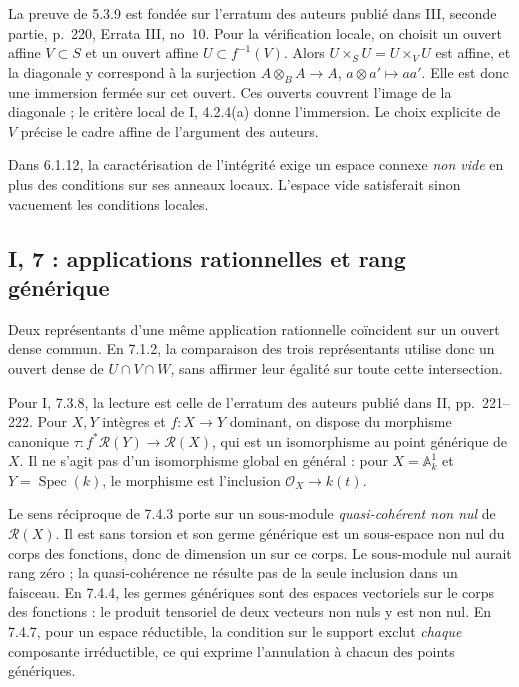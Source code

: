 \documentclass[11pt,a4paper]{article}
\begin{document}
La preuve de 5.3.9 est fondée sur l'erratum des auteurs publié dans
III, seconde partie, p.~220, Errata III, no~10.
Pour la vérification locale, on choisit un ouvert affine $V\subset S$
et un ouvert affine $U\subset f^{-1}(V)$. Alors
$U\times_S U=U\times_V U$ est affine, et la diagonale y correspond
à la surjection $A\otimes_B A\to A$, $a\otimes a'\mapsto aa'$.
Elle est donc une immersion fermée sur cet ouvert. Ces ouverts
couvrent l'image de la diagonale ; le critère local de I, 4.2.4(a)
donne l'immersion. Le choix explicite de $V$ précise le cadre affine
de l'argument des auteurs.

Dans 6.1.12, la caractérisation de l'intégrité exige un espace
connexe \emph{non vide} en plus des conditions sur ses anneaux locaux.
L'espace vide satisferait sinon vacuement les conditions locales.

\subsection{I, 7 : applications rationnelles et rang générique}
\label{note:base1-rational}
Deux représentants d'une même application rationnelle coïncident
sur un ouvert dense commun. En 7.1.2, la comparaison des trois
représentants utilise donc un ouvert dense de $U\cap V\cap W$,
sans affirmer leur égalité sur toute cette intersection.

Pour I, 7.3.8, la lecture est celle de l'erratum des auteurs publié
dans II, pp.~221--222. Pour $X,Y$ intègres et $f:X\to Y$ dominant,
on dispose du morphisme canonique
$\tau:f^*\mathscr R(Y)\to\mathscr R(X)$, qui est un isomorphisme
au point générique de $X$. Il ne s'agit pas d'un isomorphisme global
en général : pour $X=\mathbb A^1_k$ et $Y=\operatorname{Spec}(k)$,
le morphisme est l'inclusion $\mathcal O_X\to k(t)$.

Le sens réciproque de 7.4.3 porte sur un sous-module
\emph{quasi-cohérent non nul} de $\mathscr R(X)$.
Il est sans torsion et son germe générique est un sous-espace non nul
du corps des fonctions, donc de dimension un sur ce corps.
Le sous-module nul aurait rang zéro ; la quasi-cohérence ne résulte
pas de la seule inclusion dans un faisceau.
En 7.4.4, les germes génériques sont des espaces vectoriels sur
le corps des fonctions : le produit tensoriel de deux vecteurs
non nuls y est non nul. En 7.4.7, pour un espace réductible, la
condition sur le support exclut \emph{chaque} composante irréductible,
ce qui exprime l'annulation à chacun des points génériques.
\end{document}
